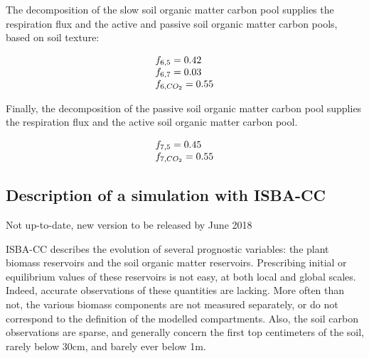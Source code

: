 {The decomposition of the slow soil organic matter carbon pool supplies the respiration flux 
and the active and passive soil organic matter carbon pools, based on soil texture: 

\begin{equation}
\begin{tabular}{l}
$ f_{6,5} = 0.42 $ \\
$ f_{6,7} = 0.03 $ \\
$ f_{6,CO_2} = 0.55 $ \\
\end{tabular}
\end{equation}

Finally, the decomposition of the passive soil organic matter carbon pool supplies the respiration flux 
and the active soil organic matter carbon pool.

\begin{equation}
\begin{tabular}{l}
$ f_{7,5} = 0.45 $ \\
$ f_{7,CO_2} = 0.55 $ \\
\end{tabular}
\end{equation}



\subsection{Description of a simulation with ISBA-CC}{Not up-to-date, new version to be released by June 2018}

ISBA-CC describes the evolution of several prognostic variables:
the plant biomass reservoirs and the soil organic matter reservoirs.
Prescribing initial or equilibrium values of these reservoirs is not easy, at both 
local and global scales. 
Indeed, accurate observations of these quantities are lacking. 
More often than not, the various biomass components are not measured separately, 
or do not correspond to the definition of the modelled compartments. 
Also, the soil carbon observations are sparse, and generally concern the first top centimeters 
of the soil, rarely below 30cm, and barely ever below 1m.

}
